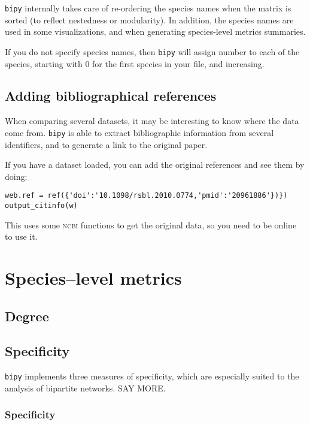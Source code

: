 \documentclass[10pt]{scrbook}
\begin{document}
\texttt{bipy} internally takes care of re-ordering the species names when the matrix is sorted (to reflect nestedness or modularity). In addition, the species names are used in some visualizations, and when generating species-level metrics summaries. 

If you do not specify species names, then \texttt{bipy} will assign number to each of the species, starting with 0 for the first species in your file, and increasing.

\section{Adding bibliographical references}

When comparing several datasets, it may be interesting to know where the data come from. \texttt{bipy} is able to extract bibliographic information from several identifiers, and to generate a link to the original paper.

If you have a dataset loaded, you can add the original references and see them by doing:

\begin{lstlisting}[caption=attributing a reference]
web.ref = ref({'doi':'10.1098/rsbl.2010.0774,'pmid':'20961886'})})
output_citinfo(w)
\end{lstlisting}

This uses some \textsc{ncbi} functions to get the original data, so you need to be online to use it. 

\chapter{Species--level metrics}

\section{Degree}

\section{Specificity}

\texttt{bipy} implements three measures of specificity, which are especially suited to the analysis of bipartite networks. SAY MORE.

\subsection{Specificity}
\end{document}
